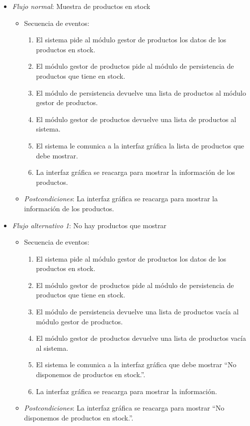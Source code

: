 \begin{enumerate}[{\bf UC-1}]
\begin{itemize}
  \item {\it Flujo normal}: Muestra de productos en stock
\begin{itemize}
\item Secuencia de eventos:
    \begin{enumerate}[1. ]
    \item El sistema pide al módulo gestor de productos los datos de los productos en stock.
    \item El módulo gestor de productos pide al módulo de persistencia de productos que tiene en stock.
    \item El módulo de persistencia devuelve una lista de productos al módulo gestor de productos.
    \item El módulo gestor de productos devuelve una lista de productos al sistema.
    \item El sistema le comunica a la interfaz gráfica la lista de productos que debe mostrar.
    \item La interfaz gráfica se reacarga para mostrar la información de los productos.
    \end{enumerate}
  \item {\it Postcondiciones}: La interfaz gráfica se reacarga para mostrar la información de los productos.
\end{itemize}

  \item {\it Flujo alternativo 1}: No hay productos que mostrar
\begin{itemize}
\item Secuencia de eventos:

    \begin{enumerate}[1. ]
    \item El sistema pide al módulo gestor de productos los datos de los productos en stock.
    \item El módulo gestor de productos pide al módulo de persistencia de productos que tiene en stock.
    \item El módulo de persistencia devuelve una lista de productos vacía al módulo gestor de productos.
    \item El módulo gestor de productos devuelve una lista de productos vacía al sistema.
    \item El sistema le comunica a la interfaz gráfica que debe mostrar ``No disponemos de productos en stock.''.
    \item La interfaz gráfica se reacarga para mostrar la información.
    \end{enumerate}
  \item {\it Postcondiciones}: La interfaz gráfica se reacarga para mostrar ``No disponemos de productos en stock.''.
  \end{itemize}


\end{itemize}
\end{enumerate}
